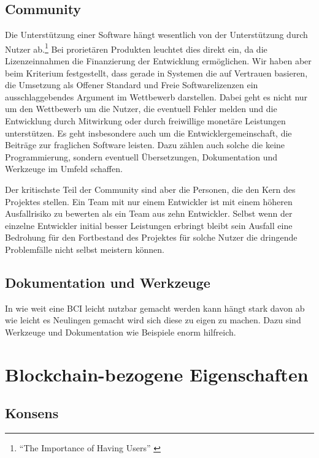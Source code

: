 \subsection{Community}\label{krit:community}

Die Unterstützung einer Software hängt wesentlich von der Unterstützung durch Nutzer ab.\footnote{\enquote{The Importance of Having Users} \autocite{Raymond:CB}} Bei prorietären Produkten leuchtet dies direkt ein, da die Lizenzeinnahmen die Finanzierung der Entwicklung ermöglichen. Wir haben aber beim Kriterium  festgestellt, dass gerade in Systemen die auf Vertrauen basieren, die Umsetzung als Offener Standard und Freie Softwarelizenzen ein ausschlaggebendes Argument im Wettbewerb darstellen. 
Dabei geht es nicht nur um den Wettbewerb um die Nutzer, die eventuell Fehler melden und die Entwicklung durch Mitwirkung oder durch freiwillige monetäre Leistungen unterstützen. Es geht insbesondere auch um die Entwicklergemeinschaft, die Beiträge zur fraglichen Software leisten. Dazu zählen auch solche die keine Programmierung, sondern eventuell Übersetzungen, Dokumentation und Werkzeuge im Umfeld schaffen.

Der kritischste Teil der Community sind aber die Personen, die den Kern des Projektes stellen. Ein Team mit nur einem Entwickler ist mit einem höheren Ausfallrisiko zu bewerten als ein Team aus zehn Entwickler. Selbst wenn der einzelne Entwickler initial besser Leistungen erbringt bleibt sein Ausfall eine Bedrohung für den Fortbestand des Projektes für solche Nutzer die dringende Problemfälle nicht selbst meistern können.

\subsection{Dokumentation und Werkzeuge}\label{krit:werkzeuge}

In wie weit eine \gls{BCI} leicht nutzbar gemacht werden kann hängt stark davon ab wie leicht es Neulingen gemacht wird sich diese zu eigen zu machen.
Dazu sind Werkzeuge und Dokumentation wie Beispiele enorm hilfreich.

\section{Blockchain-bezogene Eigenschaften}\label{krit:blockchainproperties}

\subsection{Konsens}\label{krit:consensus}

